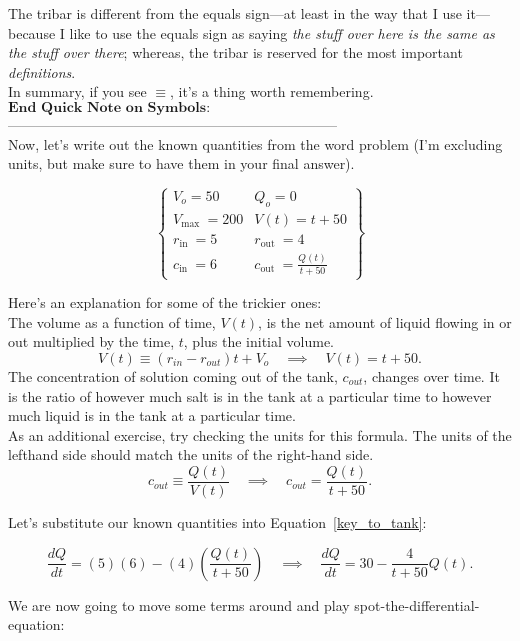 \documentclass[a4paper,12pt]{article} %
\begin{document}
The tribar is different from the equals sign---at least in the way that I use it---because I like to use the equals sign as saying \textit{the stuff over here is the same as the stuff over there}; whereas, the tribar is reserved for the most important \textit{definitions}.\\

In summary, if you see $\equiv$, it's a thing worth remembering.\\

$\boxed{\textbf{End Quick Note on Symbols:}}$-----------------------------------------------------------------------\\

Now, let's write out the known quantities from the word problem (I'm excluding units, but make sure to have them in your final answer).


$$\left\{\begin{array}{ll}V_o=50 & Q_o=0 \\ V_{\text {max }}=200 & V(t)=t+50 \\ r_{\text {in }}=5 & r_{\text {out }}=4 \\ c_{\text {in }}=6 & c_{\text {out }}=\frac{Q(t)}{t+50}\end{array}\right\}$$

Here's an explanation for some of the trickier ones:\\

The volume as a function of time, $V(t)$, is the net amount of liquid flowing in or out multiplied by the time, $t$, plus the initial volume.
$$ V(t) \equiv (r_{in} - r_{out})t + V_o \quad\implies\quad V(t) = t + 50.
$$
The concentration of solution coming out of the tank, $c_{out}$, changes over time. It is the ratio of however much salt is in the tank at a particular time to however much liquid is in the tank at a particular time.\\

As an additional exercise, try checking the units for this formula. The units of the lefthand side should match the units of the right-hand side.
$$ 
 c_{out} \equiv \frac{Q(t)}{V(t)} \quad\implies\quad  c_{out} = \frac{Q(t)}{t + 50}.
$$

Let's substitute our known quantities into Equation~\ref{key_to_tank}:

$$ \frac{dQ}{dt} = (5)(6) - (4) \left(\frac{Q(t)}{t + 50}\right) \quad\implies\quad \frac{dQ}{dt} = 30 - \frac{4}{t + 50}Q(t).
 $$

We are now going to move some terms around and play spot-the-differential-equation:
\end{document}
